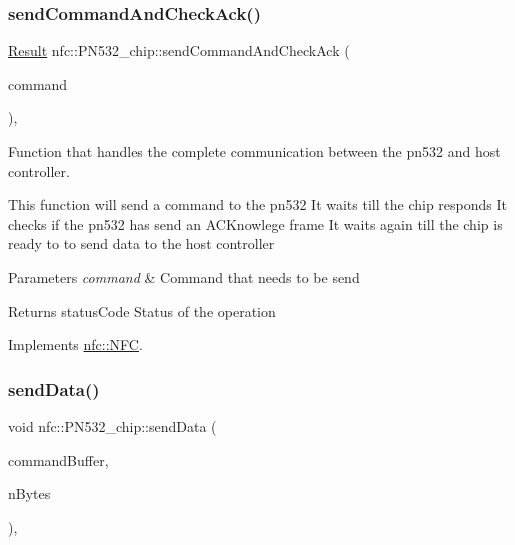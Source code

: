 \subsubsection{\texorpdfstring{send\+Command\+And\+Check\+Ack()}{sendCommandAndCheckAck()}}
{\footnotesize\ttfamily \hyperlink{structnfc_1_1Result}{Result} nfc\+::\+P\+N532\+\_\+chip\+::send\+Command\+And\+Check\+Ack (\begin{DoxyParamCaption}\item[{\hyperlink{classsetupSendCommand}{setup\+Send\+Command} \&}]{command }\end{DoxyParamCaption})\hspace{0.3cm}{\ttfamily [override]}, {\ttfamily [virtual]}}



Function that handles the complete communication between the pn532 and host controller. 

This function will send a command to the pn532 It waits till the chip responds It checks if the pn532 has send an A\+C\+Knowlege frame It waits again till the chip is ready to to send data to the host controller 
\begin{DoxyParams}{Parameters}
{\em command} & Command that needs to be send \\
\hline
\end{DoxyParams}
\begin{DoxyReturn}{Returns}
status\+Code Status of the operation 
\end{DoxyReturn}


Implements \hyperlink{classnfc_1_1NFC_a2a14e65f49707ef1efaea07ec9fce1c8}{nfc\+::\+N\+FC}.

\mbox{\label{classnfc_1_1PN532__chip_aab53fb1c9fced99ce154ab035f795302}} 
\subsubsection{\texorpdfstring{send\+Data()}{sendData()}}
{\footnotesize\ttfamily void nfc\+::\+P\+N532\+\_\+chip\+::send\+Data (\begin{DoxyParamCaption}\item[{uint8\+\_\+t $\ast$}]{command\+Buffer,  }\item[{const uint8\+\_\+t}]{n\+Bytes }\end{DoxyParamCaption})\hspace{0.3cm}{\ttfamily [override]}, {\ttfamily [virtual]}}



